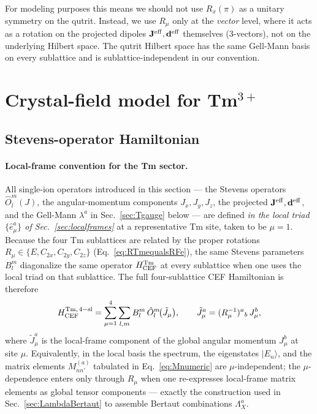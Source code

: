 \documentclass[reprint,amsmath,amssymb,aps,prb,longbibliography]{revtex4-2}
\newcommand{\Jeff}{\mathbf{J}^{\rm eff}}
\newcommand{\deff}{\mathbf{d}^{\rm eff}}
\begin{document}
For modeling purposes this means we should not use $R_x(\pi)$ as a
unitary symmetry on the qutrit. Instead, we use $R_\mu$ only at the
\emph{vector} level, where it acts as a rotation on the projected
dipoles $\Jeff,\deff$ themselves (3-vectors), not on the underlying
Hilbert space. The qutrit Hilbert space has the same Gell-Mann basis on
every sublattice and is sublattice-independent in our convention.

\section{Crystal-field model for Tm\texorpdfstring{$^{3+}$}{3+}}
\label{sec:CEF}

\subsection{Stevens-operator Hamiltonian}

\paragraph{Local-frame convention for the Tm sector.} All
single-ion operators introduced in this section --- the Stevens
operators $\hat O_l^m(J)$, the angular-momentum components
$J_x,J_y,J_z$, the projected $\Jeff,\deff$, and the Gell-Mann
$\lambda^a$ in Sec.~\ref{sec:Tgauge} below --- are defined
\emph{in the local triad $\{\hat e^a_\mu\}$ of
Sec.~\ref{sec:localframes}} at a representative Tm site, taken to be
$\mu=1$. Because the four Tm sublattices are related by the proper
rotations $R_\mu\in\{E,C_{2x},C_{2y},C_{2z}\}$
(Eq.~\eqref{eq:RTmequalsRFe}), the same Stevens parameters $B_l^m$
diagonalize the same operator $H_{\rm CEF}^{\rm Tm}$ at every
sublattice when one uses the local triad on that sublattice. The full
four-sublattice CEF Hamiltonian is therefore
\begin{equation}
H_{\rm CEF}^{\rm Tm,\,4-sl} = \sum_{\mu=1}^{4}\sum_{l,m} B_l^m\,
\hat O_l^m\!\bigl(\tilde J_\mu\bigr),
\qquad \tilde J^a_\mu = (R_\mu^{-1})^a{}_b\,J^b_\mu,
\label{eq:HCEF4sl}
\end{equation}
where $\tilde J^a_\mu$ is the local-frame component of the global
angular momentum $J^b_\mu$ at site $\mu$. Equivalently, in the local
basis the spectrum, the eigenstates $|E_n\rangle$, and the matrix
elements $M_{nn'}^{(a)}$ tabulated in Eq.~\eqref{eq:Mnumeric} are
$\mu$-independent; the $\mu$-dependence enters only through $R_\mu$
when one re-expresses local-frame matrix elements as global tensor
components --- exactly the construction used in
Sec.~\ref{sec:LambdaBertaut} to assemble Bertaut combinations $\Lambda^a_X$.
\end{document}
